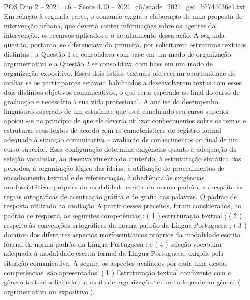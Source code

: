 \begin{textsample}{POS Dim 2 – 2021\_c6 – Score 4.00 – 2021\_c6/enade\_2021\_geo\_b7744036e1.txt}
Em relação à segunda parte, o comando exigia a elaboração de uma proposta de intervenção urbana, que deveria conter informações sobre os agentes da intervenção, os recursos aplicados e o detalhamento dessa ação.
A segunda questão, portanto, se diferenciava da primeira, por solicitarem estruturas textuais distintas : a Questão 1 se consolidava com base em um modo de organização argumentativo e a Questão 2 se consolidava com base em um modo de organização expositivo.
Esses dois estilos textuais ofereceram oportunidade de avaliar se os participantes estavam habilitados a desenvolverem textos com esses dois distintos objetivos comunicativos, o que seria esperado ao final do curso de graduação e necessário à sua vida profissional.
A análise do desempenho linguístico esperado de um estudante que está concluindo seu curso superior apoiou -se no princípio de que ele deveria utilizar conhecimentos sobre os temas e estruturar seus textos de acordo com as características do registro formal adequado à situação comunicativa – avaliação de conhecimentos ao final de um curso superior.
Essa configuração determina exigências quanto à adequação da seleção vocabular, ao desenvolvimento do conteúdo, à estruturação sintática dos períodos, à organização lógica das ideias, à utilização de procedimentos de encadeamento textual e de referenciação, à obediência às exigências morfossintáticas próprias da modalidade escrita da norma-padrão, ao respeito às regras ortográficas de acentuação gráfica e de grafia das palavras.
O padrão de resposta utilizado na avaliação A partir desses preceitos, foram considerados, no padrão de resposta, as seguintes competências : ( 1 ) estruturação textual ; ( 2 ) respeito às convenções ortográficas da norma-padrão da Língua Portuguesa ; ( 3 ) domínio dos diferentes aspectos morfossintáticos próprios da modalidade escrita formal da norma-padrão da Língua Portuguesa ; e ( 4 ) seleção vocabular adequada à modalidade escrita formal da Língua Portuguesa, exigida pela situação comunicativa.
A seguir, os aspectos avaliados por cada uma destas competências, são apresentados. ( 1 ) Estruturação textual condizente com o gênero textual solicitado e o modo de organização textual adequado ao gênero ( argumentativo ou expositivo ).

\end{textsample}
